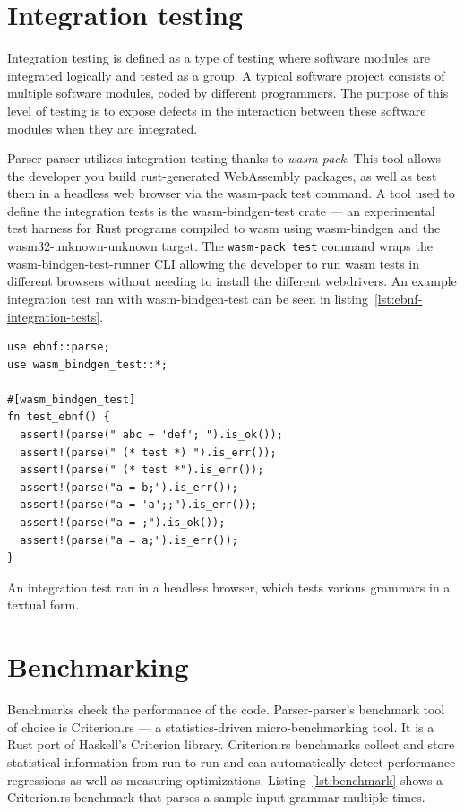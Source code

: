\documentclass[english,engineering]{wizthesis}
\newcommand{\thisproject}{Parser-parser}
\begin{document}
\section{Integration testing}

Integration testing is defined as a type of testing where software modules are
integrated logically and tested as a group. A typical software project consists
of multiple software modules, coded by different programmers. The purpose of
this level of testing is to expose defects in the interaction between these
software modules when they are integrated.

\thisproject{} utilizes integration testing thanks to \emph{wasm-pack}. This
tool allows the developer you build rust-generated WebAssembly packages, as well
as test them in a headless web browser via the wasm-pack test command. A tool
used to define the integration tests is the wasm-bindgen-test crate --- an
experimental test harness for Rust programs compiled to wasm using wasm-bindgen
and the wasm32-unknown-unknown target. The \texttt{wasm-pack test} command wraps
the wasm-bindgen-test-runner CLI allowing the developer to run wasm tests in
different browsers without needing to install the different webdrivers. An
example integration test ran with wasm-bindgen-test can be seen in
listing~\ref{lst:ebnf-integration-tests}.

\begin{listing}[H]
  \begin{verbatim}
use ebnf::parse;
use wasm_bindgen_test::*;

#[wasm_bindgen_test]
fn test_ebnf() {
  assert!(parse(" abc = 'def'; ").is_ok());
  assert!(parse(" (* test *) ").is_err());
  assert!(parse(" (* test *").is_err());
  assert!(parse("a = b;").is_err());
  assert!(parse("a = 'a';;").is_err());
  assert!(parse("a = ;").is_ok());
  assert!(parse("a = a;").is_err());
}
  \end{verbatim}
  \caption{An integration test ran in a headless browser, which tests various
  grammars in a textual form.}
  \label{lst:ebnf-integration-tests}
\end{listing}

\section{Benchmarking}

Benchmarks check the performance of the code. \thisproject{}'s benchmark tool of
choice is Criterion.rs --- a statistics-driven micro-benchmarking tool. It is a
Rust port of Haskell's Criterion library. Criterion.rs benchmarks collect and
store statistical information from run to run and can automatically detect
performance regressions as well as measuring optimizations.
Listing~\ref{lst:benchmark} shows a Criterion.rs benchmark that parses a sample
input grammar multiple times.
\end{document}
